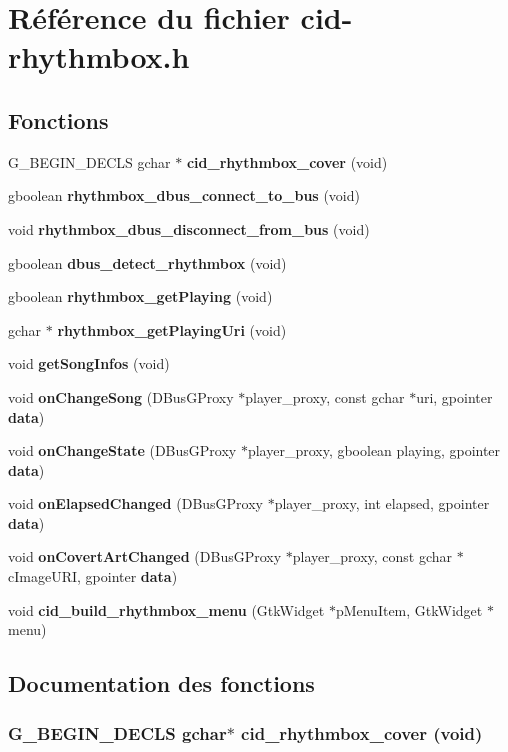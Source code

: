 \section{Référence du fichier cid-rhythmbox.h}
\label{cid-rhythmbox_8h}
\subsection*{Fonctions}
\begin{CompactItemize}
\item 
G\_\-BEGIN\_\-DECLS gchar $\ast$ {\bf cid\_\-rhythmbox\_\-cover} (void)
\item 
gboolean {\bf rhythmbox\_\-dbus\_\-connect\_\-to\_\-bus} (void)
\item 
void {\bf rhythmbox\_\-dbus\_\-disconnect\_\-from\_\-bus} (void)
\item 
gboolean {\bf dbus\_\-detect\_\-rhythmbox} (void)
\item 
gboolean {\bf rhythmbox\_\-getPlaying} (void)
\item 
gchar $\ast$ {\bf rhythmbox\_\-getPlayingUri} (void)
\item 
void {\bf getSongInfos} (void)
\item 
void {\bf onChangeSong} (DBusGProxy $\ast$player\_\-proxy, const gchar $\ast$uri, gpointer {\bf data})
\item 
void {\bf onChangeState} (DBusGProxy $\ast$player\_\-proxy, gboolean playing, gpointer {\bf data})
\item 
void {\bf onElapsedChanged} (DBusGProxy $\ast$player\_\-proxy, int elapsed, gpointer {\bf data})
\item 
void {\bf onCovertArtChanged} (DBusGProxy $\ast$player\_\-proxy, const gchar $\ast$cImageURI, gpointer {\bf data})
\item 
void {\bf cid\_\-build\_\-rhythmbox\_\-menu} (GtkWidget $\ast$pMenuItem, GtkWidget $\ast$menu)
\end{CompactItemize}


\subsection{Documentation des fonctions}
\subsubsection{\setlength{\rightskip}{0pt plus 5cm}G\_\-BEGIN\_\-DECLS gchar$\ast$ cid\_\-rhythmbox\_\-cover (void)}\label{cid-rhythmbox_8h_131282f172c97b391b448a3bc21fe59a}


